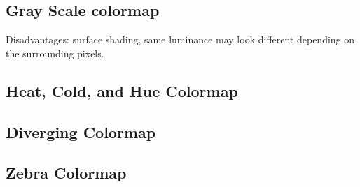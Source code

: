 


\subsection{Gray Scale colormap} %
\label{ssub:gray_scale_colormap}

Disadvantages: surface shading, same luminance may look different depending on the surrounding pixels.

\subsection{Heat, Cold, and Hue Colormap} %
\label{sub:heat_and_cold_colormap}

\subsection{Diverging Colormap} %
\label{sub:diverging_colormap}


\subsection{Zebra Colormap} %
\label{sub:zebra_colormap}


